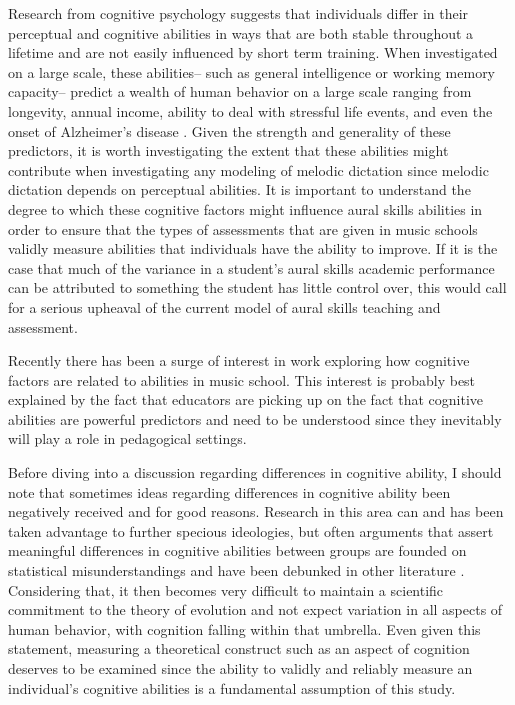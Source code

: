 \documentclass[]{book}
\begin{document}
Research from cognitive psychology suggests that individuals differ in their perceptual and cognitive abilities in ways that are both stable throughout a lifetime and are not easily influenced by short term training.
When investigated on a large scale, these abilities-- such as general intelligence or working memory capacity-- predict a wealth of human behavior on a large scale ranging from longevity, annual income, ability to deal with stressful life events, and even the onset of Alzheimer's disease \citep{ritchieIntelligenceAllThat2015, unsworthAutomatedVersionOperation2005}.
Given the strength and generality of these predictors, it is worth investigating the extent that these abilities might contribute when investigating any modeling of melodic dictation since melodic dictation depends on perceptual abilities.
It is important to understand the degree to which these cognitive factors might influence aural skills abilities in order to ensure that the types of assessments that are given in music schools validly measure abilities that individuals have the ability to improve.
If it is the case that much of the variance in a student's aural skills academic performance can be attributed to something the student has little control over, this would call for a serious upheaval of the current model of aural skills teaching and assessment.

Recently there has been a surge of interest in work exploring how cognitive factors are related to abilities in music school.
This interest is probably best explained by the fact that educators are picking up on the fact that cognitive abilities are powerful predictors and need to be understood since they inevitably will play a role in pedagogical settings.

Before diving into a discussion regarding differences in cognitive ability, I should note that sometimes ideas regarding differences in cognitive ability been negatively received and for good reasons.
Research in this area can and has been taken advantage to further specious ideologies, but often arguments that assert meaningful differences in cognitive abilities between groups are founded on statistical misunderstandings and have been debunked in other literature \citep{gouldMismeasureMan1996}.
Considering that, it then becomes very difficult to maintain a scientific commitment to the theory of evolution \citep{darwinOriginSpecies1859} and not expect variation in all aspects of human behavior, with cognition falling within that umbrella.
Even given this statement, measuring a theoretical construct such as an aspect of cognition deserves to be examined since the ability to validly and reliably measure an individual's cognitive abilities is a fundamental assumption of this study.
\end{document}
